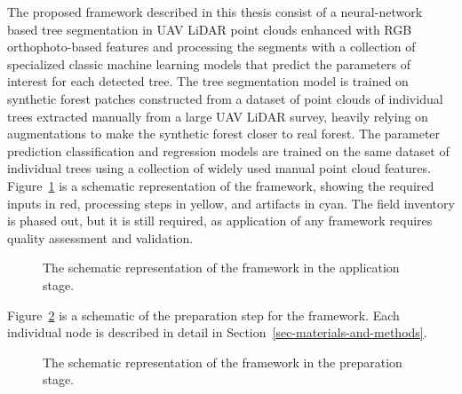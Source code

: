 The proposed framework described in this thesis consist of a neural-network based tree segmentation in UAV LiDAR point clouds enhanced with RGB orthophoto-based features and processing the segments with a collection of specialized classic machine learning models that predict the parameters of interest for each detected tree.
The tree segmentation model is trained on synthetic forest patches constructed from a dataset of point clouds of individual trees extracted manually from a large UAV LiDAR survey, heavily relying on augmentations to make the synthetic forest closer to real forest.
The parameter prediction classification and regression models are trained on the same dataset of individual trees using a collection of widely used manual point cloud features.
Figure~\ref{fig-framework-apply} is a schematic representation of the framework, showing the required inputs in red, processing steps in yellow, and artifacts in cyan.
The field inventory is phased out, but it is still required, as application of any framework requires quality assessment and validation.


\begin{figure}
\caption{\label{fig-framework-apply}The schematic representation of the
framework in the application stage.}
\end{figure}

Figure~\ref{fig-framework-prepare} is a schematic of the preparation step for the framework.
Each individual node is described in detail in Section~\ref{sec-materials-and-methods}.


\begin{figure}
\caption{\label{fig-framework-prepare}The schematic representation of
the framework in the preparation stage.}
\end{figure}

